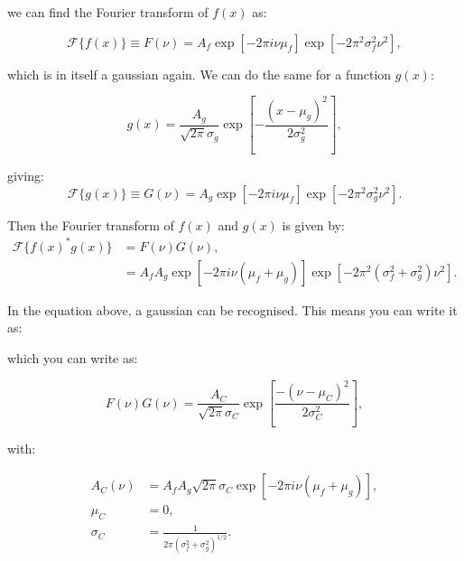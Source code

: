 we can find the Fourier transform of $f(x)$ as:

\begin{equation}\label{eq_FT_gauss}
	\mathcal{F}\{f(x)\} \equiv F(\nu) = A_f \exp{\left[-2 \pi i \nu \mu_{f}\right]} \exp{\left[-2 \pi^{2} \sigma_{f}^{2} \nu^{2}\right]},
\end{equation}

which is in itself a gaussian again. We can do the same for a function $g(x)$:

\begin{equation}
g(x)=\frac{A_{g}}{\sqrt{2\pi}\sigma_g} \exp{\left[-\frac{\left(x-\mu_{g}\right)^{2}}{2 \sigma_{g}^{2}}\right]},
\end{equation}

giving:
\begin{equation}
	\mathcal{F}\{g(x)\} \equiv G(\nu) = A_g \exp{\left[-2 \pi i \nu \mu_{f}\right]} \exp{\left[-2 \pi^{2} \sigma_{g}^{2} \nu^{2}\right]}.
\end{equation}


Then the Fourier transform of $f(x)$ and $g(x)$ is given by:
\begin{equation}
\begin{aligned}
\mathcal{F}\{f(x)^*g(x)\} &= F(\nu)G(\nu), \\
 &=A_f A_g \exp{\left[-2 \pi i \nu\left(\mu_{f}+\mu_{g}\right)\right]} \exp{\left[-2 \pi^{2}\left(\sigma_{f}^{2}+\sigma_{g}^{2}\right) \nu^{2}\right]}.
\end{aligned}
\end{equation}

In the equation above, a gaussian can be recognised. This means you can write it as:

which you can write as:

\begin{equation}
F(\nu)G(\nu) = \frac{A_C}{\sqrt{2\pi}\sigma_C} \exp{\left[\frac{-(\nu-\mu_C)^2}{2\sigma_C^2}\right]},
\end{equation}

with:

\begin{equation}
\begin{aligned}
A_C(\nu) &= A_f A_g \sqrt{2\pi}\sigma_C \exp{\left[-2 \pi i \nu\left(\mu_{f}+\mu_{g}\right)\right]} ,\\
\mu_C &= 0,\\
\sigma_C &= \frac{1}{2\pi(\sigma_f^2+\sigma_g^2)^{1/2}}.
\end{aligned}
\end{equation}




